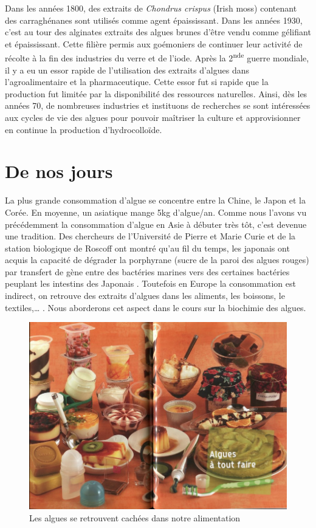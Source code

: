 \documentclass[
]{book}
\begin{document}
Dans les années 1800, des extraits de \emph{Chondrus crispus} (Irish moss) contenant des carraghénanes sont utilisés comme agent épaississant. Dans les années 1930, c'est au tour des alginates extraits des algues brunes d'être vendu comme gélifiant et épaississant. Cette filière permis aux goémoniers de continuer leur activité de récolte à la fin des industries du verre et de l'iode. Après la 2\textsuperscript{nde} guerre mondiale, il y a eu un essor rapide de l'utilisation des extraits d'algues dans l'agroalimentaire et la pharmaceutique. Cette essor fut si rapide que la production fut limitée par la disponibilité des ressources naturelles. Ainsi, dès les années 70, de nombreuses industries et instituons de recherches se sont intéressées aux cycles de vie des algues pour pouvoir maîtriser la culture et approvisionner en continue la production d'hydrocolloïde.

\hypertarget{de-nos-jours}{%
\section{De nos jours}\label{de-nos-jours}}

La plus grande consommation d'algue se concentre entre la Chine, le Japon et la Corée. En moyenne, un asiatique mange 5kg d'algue/an. Comme nous l'avons vu précédemment la consommation d'algue en Asie à débuter très tôt, c'est devenue une tradition. Des chercheurs de l'Université de Pierre et Marie Curie et de la station biologique de Roscoff ont montré qu'au fil du temps, les japonais ont acquis la capacité de dégrader la porphyrane (sucre de la paroi des algues rouges) par transfert de gène entre des bactéries marines vers des certaines bactéries peuplant les intestins des Japonais \citep{hehemann2010}.
Toutefois en Europe la consommation est indirect, on retrouve des extraits d'algues dans les aliments, les boissons, le textiles,\ldots{} .
Nous aborderons cet aspect dans le cours sur la biochimie des algues.

\begin{figure}

{\centering \includegraphics[width=11.99in]{images/alguetoutfaire} 

}

\caption{Les algues se retrouvent cachées dans notre alimentation}\label{fig:algueatoutfaire}
\end{figure}
\end{document}

